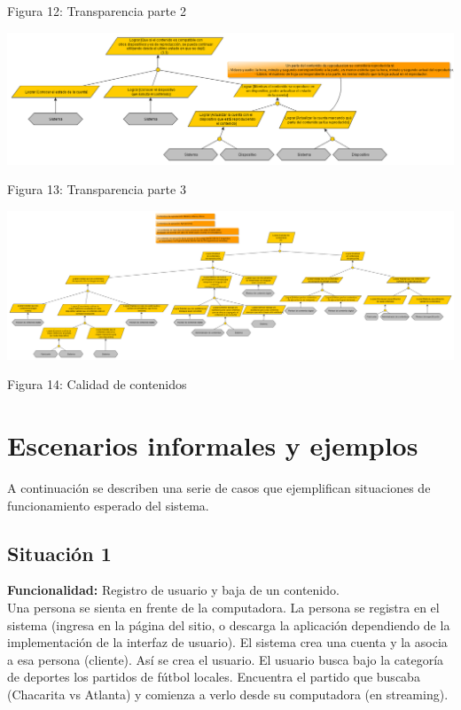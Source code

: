 \documentclass[11pt, a4paper, spanish]{article}
\begin{document}
	\begin{center}
		\small{Figura 12: Transparencia parte 2}
	\end{center}
\newpage
	\begin{center}
		\includegraphics[scale=0.43, angle=90]{Diagramas/3-3ModelodeObjetivosTransparencia.png}
	\end{center}
	\begin{center}
		\small{Figura 13: Transparencia parte 3}
	\end{center}
\newpage
	\begin{center}
		\includegraphics[scale=0.25, angle=90]{Diagramas/4ModelodeObjetivosCalidaddecontenidos.png}
	\end{center}
	\begin{center}
		\small{Figura 14: Calidad de contenidos}
	\end{center}
\newpage


\section{Escenarios informales y ejemplos}
	
	A continuaci\'on se describen una serie de casos que ejemplifican situaciones de funcionamiento esperado del sistema.

\subsection{Situaci\'on 1}

	\textbf{Funcionalidad:} Registro de usuario y baja de un contenido.\\

        Una persona se sienta en frente de la computadora.
    La persona se registra en el sistema (ingresa en la p\'agina del sitio, o descarga 
    la aplicaci\'on dependiendo de la implementaci\'on  de la interfaz de usuario).
    El sistema crea una cuenta y la asocia a esa persona (cliente). As\'i se crea el usuario.
    El usuario busca bajo la categor\'ia de deportes los partidos de f\'utbol locales.
    Encuentra el partido que buscaba (Chacarita vs Atlanta) y comienza a verlo desde su computadora (en streaming).\\
\end{document}
